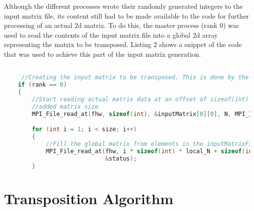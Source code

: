 \documentclass[journal]{IEEEtran}
\begin{document}
\noindent
Although the different processes wrote their randomly generated integers to the input matrix file, its content still had to be made available to the code for further processing of an actual 2d matrix. To do this, the master process (rank 0) was used to read the contents of the input matrix file into a global 2d array representing the matrix to be transposed. Listing 2 shows a snippet of the code that was used to achieve this part of the input matrix generation.


\begin{lstlisting}[language = C, caption = input matrix generation]

     //Creating the input matrix to be transposed. This is done by the master process
    if (rank == 0)
    {
        //Start reading actual matrix data at an offset of sizeof(int) to account for the
        //added matrix size
        MPI_File_read_at(fhw, sizeof(int), &inputMatrix[0][0], N, MPI_INT, MPI_STATUS_IGNORE);

        for (int i = 1; i < size; i++)
        {
            //Fill the global matrix from elements in the inputMatrixFile
            MPI_File_read_at(fhw, i * sizeof(int) * local_N + sizeof(int), &inputMatrix[i][0], N, MPI_INT,
                             &status);
        }
\end{lstlisting}


\section{Transposition Algorithm}
\end{document}
